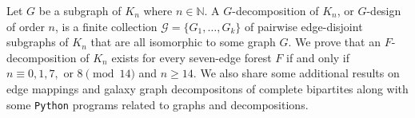 
Let $G$ be a subgraph of $K_n$ where $n \in \mathbb{N}$. A $G$-decomposition of $K_n$, or $G$-design of order $n$, is a finite collection $\mathcal{G} = \{G_1, \ldots, G_k\}$ of pairwise edge-disjoint subgraphs of $K_n$ that are all isomorphic to some graph $G$. We prove that an $F$-decomposition of $K_n$ exists for every seven-edge forest $F$ if and only if $n \equiv 0,1,7, \text{ or } 8 \pmod{14}$ and $n\geq 14$. We also share some additional results on edge mappings and galaxy graph decompositons of complete bipartites along with some \verb|Python| programs related to graphs and decompositions.

